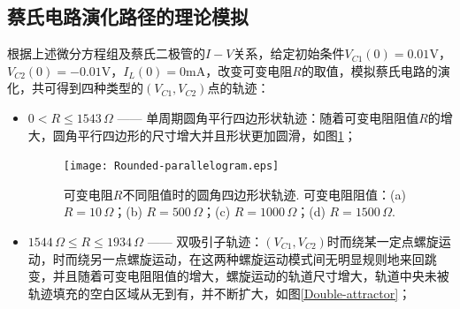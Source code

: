 \documentclass[a4paper, 10pt]{article}
\begin{document}
\begin{multicols*}{2}
\subsection{蔡氏电路演化路径的理论模拟}
根据上述微分方程组及蔡氏二极管的$I-V$关系，给定初始条件$V_{C1}(0)=0.01\mathrm{V}$，$V_{C2}(0)=-0.01\mathrm{V}$，$I_L(0)=0\mathrm{mA}$，改变可变电阻$R$的取值，模拟蔡氏电路的演化，共可得到四种类型的$(V_{C1},V_{C2})$点的轨迹：
\begin{itemize}
    \item[(1)] $0<R\leq 1543\,\Omega$ —— 单周期圆角平行四边形状轨迹：随着可变电阻阻值$R$的增大，圆角平行四边形的尺寸增大并且形状更加圆滑，如图\ref{Rounded-parallelogram}；
    \begin{figure}[H]
        \centering
        \texttt{[image: Rounded-parallelogram.eps]}
        \caption{可变电阻$R$不同阻值时的圆角四边形状轨迹. 可变电阻阻值：(a) $R=10\,\Omega$；(b) $R=500\,\Omega$；(c) $R=1000\,\Omega$；(d) $R=1500\,\Omega$.}
        \label{Rounded-parallelogram}
    \end{figure}
    \item[(2)] $1544\,\Omega\leq R\leq 1934\,\Omega$ —— 双吸引子轨迹：$(V_{C1},V_{C2})$时而绕某一定点螺旋运动，时而绕另一点螺旋运动，在这两种螺旋运动模式间无明显规则地来回跳变，并且随着可变电阻阻值的增大，螺旋运动的轨道尺寸增大，轨道中央未被轨迹填充的空白区域从无到有，并不断扩大，如图\ref{Double-attractor}；
    \begin{figure}[H]

\end{figure}
\end{itemize}
\end{multicols*}
\end{document}
